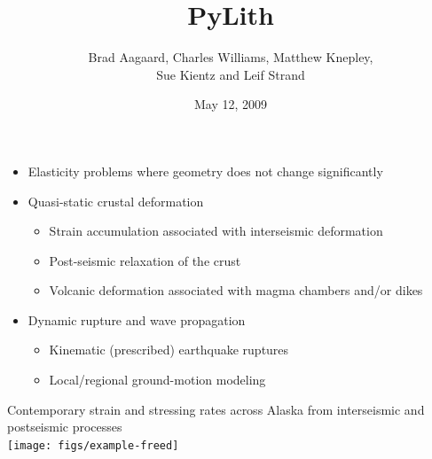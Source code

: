 \documentclass[pdftex,cig,slideColor]{pp4slides}
\title{PyLith}
\subtitle{}
\author{Brad Aagaard, Charles Williams, Matthew Knepley, \\[10pt]
  Sue Kientz and Leif Strand}
\date{May 12, 2009}
\begin{document}
\maketitle
\vfill


  \begin{itemize}
  \item Elasticity problems where geometry does not change significantly
  \item Quasi-static crustal deformation
    \begin{itemize}
    \item Strain accumulation associated with interseismic deformation
    \item Post-seismic relaxation of the crust
    \item Volcanic deformation associated with magma chambers and/or dikes
    \end{itemize}
  \item Dynamic rupture and wave propagation
    \begin{itemize}
    \item Kinematic (prescribed) earthquake ruptures
    \item Local/regional ground-motion modeling
    \end{itemize}
  \end{itemize}



  \vfill
  \begin{center}
    Contemporary strain and stressing rates across Alaska from interseismic and 
    postseismic processes \\
    \texttt{[image: figs/example-freed]}
 \end{center}
\end{document}
